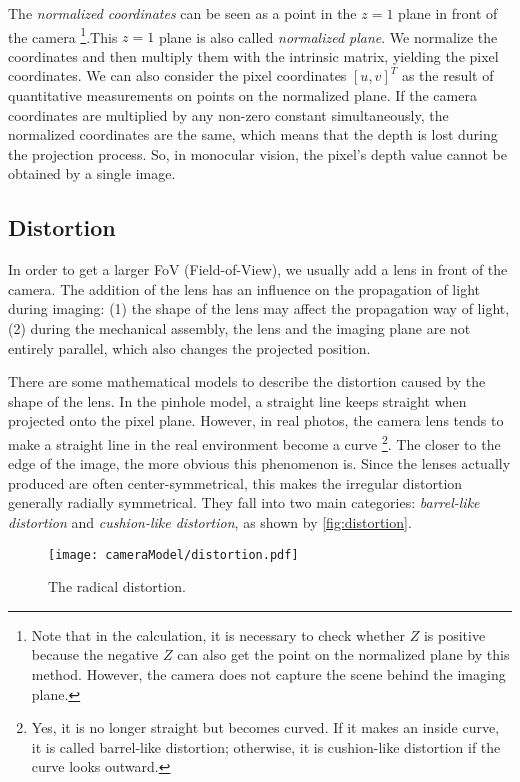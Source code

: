 The \textit{normalized coordinates} can be seen as a point in the $z=1$ plane in front of the camera \footnote{Note that in the calculation, it is necessary to check whether $Z$ is positive because the negative $Z$ can also get the point on the normalized plane by this method. However, the camera does not capture the scene behind the imaging plane. }.This $z=1$ plane is also called \textit{normalized plane}. We normalize the coordinates and then multiply them with the intrinsic matrix, yielding the pixel coordinates. We can also consider the pixel coordinates $[u,v]^T$ as the result of quantitative measurements on points on the normalized plane. If the camera coordinates are multiplied by any non-zero constant simultaneously, the normalized coordinates are the same, which means that the depth is lost during the projection process. So, in monocular vision, the pixel's depth value cannot be obtained by a single image.

\subsection{Distortion}
In order to get a larger FoV (Field-of-View), we usually add a lens in front of the camera. The addition of the lens has an influence on the propagation of light during imaging: (1) the shape of the lens may affect the propagation way of light, (2) during the mechanical assembly, the lens and the imaging plane are not entirely parallel, which also changes the projected position.

There are some mathematical models to describe the distortion caused by the shape of the lens. In the pinhole model, a straight line keeps straight when projected onto the pixel plane. However, in real photos, the camera lens tends to make a straight line in the real environment become a curve \footnote{Yes, it is no longer straight but becomes curved. If it makes an inside curve, it is called barrel-like distortion; otherwise, it is cushion-like distortion if the curve looks outward. }. The closer to the edge of the image, the more obvious this phenomenon is. Since the lenses actually produced are often center-symmetrical, this makes the irregular distortion generally radially symmetrical. They fall into two main categories: \textit{barrel-like distortion} and \textit{cushion-like distortion}, as shown by \autoref{fig:distortion}.
\begin{figure}[!t]
	\centering
	\texttt{[image: cameraModel/distortion.pdf]}
	\caption{The radical distortion.}
	\label{fig:distortion}
\end{figure}

